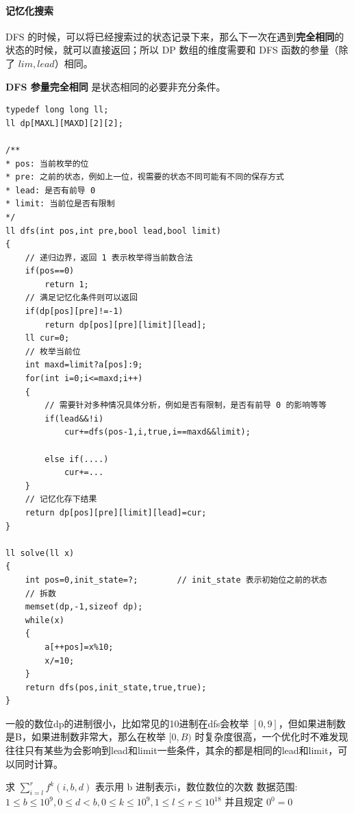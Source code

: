 \paragraph{记忆化搜索}DFS 的时候，可以将已经搜索过的状态记录下来，那么下一次在遇到\textbf{完全相同}的状态的时候，就可以直接返回；所以 DP 数组的维度需要和 DFS 函数的参量（除了 $lim, lead$）相同。

\par \textbf{DFS 参量完全相同} 是状态相同的必要非充分条件。

\begin{verbatim}
typedef long long ll;
ll dp[MAXL][MAXD][2][2];

/**
* pos: 当前枚举的位
* pre: 之前的状态，例如上一位，视需要的状态不同可能有不同的保存方式
* lead: 是否有前导 0
* limit: 当前位是否有限制
*/
ll dfs(int pos,int pre,bool lead,bool limit)
{
    // 递归边界，返回 1 表示枚举得当前数合法
    if(pos==0)
        return 1;
    // 满足记忆化条件则可以返回
    if(dp[pos][pre]!=-1)
        return dp[pos][pre][limit][lead];
    ll cur=0;
    // 枚举当前位
    int maxd=limit?a[pos]:9;
    for(int i=0;i<=maxd;i++)
    {
        // 需要针对多种情况具体分析，例如是否有限制，是否有前导 0 的影响等等
        if(lead&&!i)
            cur+=dfs(pos-1,i,true,i==maxd&&limit);

        else if(....)
            cur+=...
    }
    // 记忆化存下结果
    return dp[pos][pre][limit][lead]=cur;
}

ll solve(ll x)
{
    int pos=0,init_state=?;        // init_state 表示初始位之前的状态
    // 拆数
    memset(dp,-1,sizeof dp);
    while(x)
    {
        a[++pos]=x%10;
        x/=10;
    }
    return dfs(pos,init_state,true,true);
}
\end{verbatim}

\par \noindent 一般的数位dp的进制很小，比如常见的10进制在dfs会枚举 $[0,9]$，但如果进制数是B，如果进制数非常大，那么在枚举 $[0, B)$ 时复杂度很高，一个优化时不难发现往往只有某些为会影响到lead和limit一些条件，其余的都是相同的lead和limit，可以同时计算。
\begin{tcolorbox}
\par \noindent 求 $\sum_{i=l}^r f^k(i, b, d)$ 表示用 $\mathrm{b}$ 进制表示i，数位数位的次数 数据范围: $1 \leq b \leq 10^9, 0 \leq d<b, 0 \leq k \leq 10^9, 1 \leq l \leq r \leq 10^{18}$ 并且规定 $0^0=0$
\end{tcolorbox}

